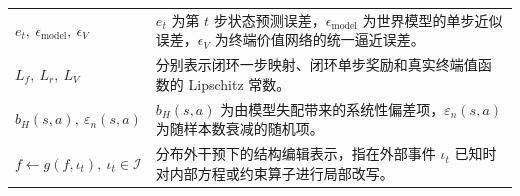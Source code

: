 \documentclass[UTF8]{ctexart}
\begin{document}
\begin{table}[ht]
\begin{tabular}{p{} p{}}
$e_t,\ \epsilon_{\text{model}},\ \epsilon_V$ & \(e_t\) 为第 \(t\) 步状态预测误差，\(\epsilon_{\text{model}}\) 为世界模型的单步近似误差，\(\epsilon_V\) 为终端价值网络的统一逼近误差。 \\
$L_f,\ L_r,\ L_V$ & 分别表示闭环一步映射、闭环单步奖励和真实终端值函数的 Lipschitz 常数。 \\
$b_H(s,a),\ \varepsilon_n(s,a)$ & \(b_H(s,a)\) 为由模型失配带来的系统性偏差项，\(\varepsilon_n(s,a)\) 为随样本数衰减的随机项。 \\
$f \leftarrow g(f,\iota_t),\ \iota_t \in \mathcal{I}$ & 分布外干预下的结构编辑表示，指在外部事件 \(\iota_t\) 已知时对内部方程或约束算子进行局部改写。 \\
\bottomrule
\end{tabular}
\end{table}
\end{document}
